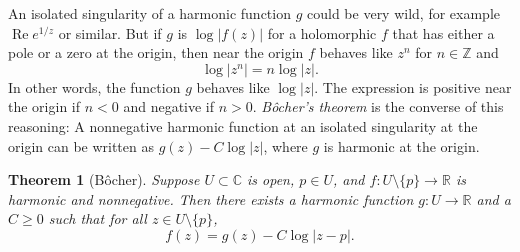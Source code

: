 \documentclass[12pt,openany]{book}
\renewcommand{\Re}{\operatorname{Re}}
\newcommand{\sabs}[1]{\lvert {#1} \rvert}
\newcommand{\abs}[1]{\left\lvert {#1} \right\rvert}
\newcommand{\C}{{\mathbb{C}}}
\newcommand{\R}{{\mathbb{R}}}
\newcommand{\Z}{{\mathbb{Z}}}
\theoremstyle{plain}
\newtheorem{thm}{Theorem}[section]
\theoremstyle{remark}
\theoremstyle{definition}
\theoremstyle{exercise}
\theoremstyle{example}
\begin{document}
An isolated singularity of a harmonic function $g$ could be very wild, for
example $\Re e^{1/z}$ or similar.  But if $g$ is $\log \sabs{f(z)}$
for a holomorphic $f$ that has either a pole or a zero at the origin,
then near the origin $f$ behaves 
like $z^n$ for $n \in \Z$ and
\begin{equation*}
\log \abs{z^n} = 
n \log \sabs{z} .
\end{equation*}
In other words, the function $g$ behaves like $\log \sabs{z}$.
The expression is positive near the origin if $n < 0$ and negative if $n > 0$.
\emph{B\^{o}cher's theorem}
is the converse of this reasoning:
A nonnegative harmonic function at an isolated singularity
at the origin can be written as
$g(z) - C \log \sabs{z}$, where $g$ is
harmonic at the origin.

\begin{thm}[B\^{o}cher]
Suppose $U \subset \C$ is open, $p \in U$, and
$f \colon U \setminus \{ p \} \to \R$ is
harmonic and nonnegative.  Then there exists a harmonic function
$g \colon U \to \R$ and a $C \geq 0$ such that
for all $z \in U \setminus \{ p \}$,
\begin{equation*}
f(z) = g(z) - C \log \sabs{z-p} .
\end{equation*}
\end{thm}
\end{document}
